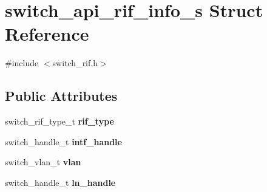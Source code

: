 \hypertarget{structswitch__api__rif__info__s}{\section{switch\+\_\+api\+\_\+rif\+\_\+info\+\_\+s Struct Reference}
\label{structswitch__api__rif__info__s}
}


{\ttfamily \#include $<$switch\+\_\+rif.\+h$>$}

\subsection*{Public Attributes}
\begin{DoxyCompactItemize}
\item 
\hypertarget{structswitch__api__rif__info__s_a0444156f2452ea09f8b316f66dcf8b82}{switch\+\_\+rif\+\_\+type\+\_\+t {\bfseries rif\+\_\+type}}\label{structswitch__api__rif__info__s_a0444156f2452ea09f8b316f66dcf8b82}

\item 
\hypertarget{structswitch__api__rif__info__s_a73c37e17f265e6010b5b93ab285210b4}{switch\+\_\+handle\+\_\+t {\bfseries intf\+\_\+handle}}\label{structswitch__api__rif__info__s_a73c37e17f265e6010b5b93ab285210b4}

\item 
\hypertarget{structswitch__api__rif__info__s_aa00e3e8a3d24d8ec17ac8fe2bc7fdefd}{switch\+\_\+vlan\+\_\+t {\bfseries vlan}}\label{structswitch__api__rif__info__s_aa00e3e8a3d24d8ec17ac8fe2bc7fdefd}

\item 
\hypertarget{structswitch__api__rif__info__s_acec2eaff404fda01fb586491a9e2c276}{switch\+\_\+handle\+\_\+t {\bfseries ln\+\_\+handle}}\label{structswitch__api__rif__info__s_acec2eaff404fda01fb586491a9e2c276}


\end{DoxyCompactItemize}
